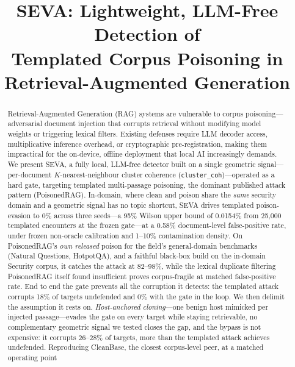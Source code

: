 \documentclass[conference]{IEEEtran}
\begin{document}
\title{SEVA: Lightweight, LLM-Free Detection of\\
Templated Corpus Poisoning in\\
Retrieval-Augmented Generation}

\author{
}

\maketitle

\begin{abstract}
Retrieval-Augmented Generation (RAG) systems are vulnerable to corpus
poisoning---adversarial document injection that corrupts retrieval without
modifying model weights or triggering lexical filters. Existing defenses
require LLM decoder access, multiplicative inference overhead, or cryptographic
pre-registration, making them impractical for the on-device, offline deployment
that local AI increasingly demands. We present SEVA, a fully local, LLM-free
detector built on a single geometric signal---per-document $K$-nearest-neighbour
cluster coherence (\texttt{cluster\_coh})---operated as a hard gate, targeting
templated multi-passage poisoning, the dominant published attack pattern
(PoisonedRAG). In-domain, where clean and poison share the \emph{same} security domain
and a geometric signal has no topic shortcut, SEVA drives templated poison-evasion to
0\% across three seeds---a 95\% Wilson upper bound of 0.0154\% from 25{,}000 templated
encounters at the frozen gate---at a 0.58\% document-level false-positive rate, under
frozen non-oracle calibration and 1--10\% contamination density. On PoisonedRAG's
\emph{own released} poison for the field's general-domain benchmarks (Natural Questions,
HotpotQA), and a faithful black-box build on the in-domain Security corpus, it catches
the attack at 82--98\%, while the lexical duplicate filtering PoisonedRAG itself found
insufficient proves corpus-fragile at matched false-positive rate. End to end the gate prevents
all the corruption it detects: the templated attack corrupts 18\% of targets undefended and 0\%
with the gate in the loop. We then delimit the assumption it rests on. \emph{Host-anchored
cloning}---one benign host mimicked per injected passage---evades the gate on every target while
staying retrievable, no complementary geometric signal we tested closes the gap, and the bypass
is not expensive: it corrupts 26--28\% of targets, more than the templated attack achieves
undefended. Reproducing CleanBase, the closest corpus-level peer, at a matched operating point

\end{abstract}
\end{document}
